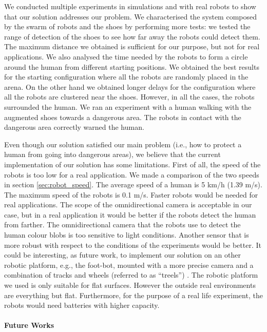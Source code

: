 \documentclass[oneside, a4paper, 12pt]{memoir}
\begin{document}
	We conducted multiple experiments in simulations and with real robots to show that our solution addresses our problem. We characterised the system composed by the swarm of robots and the shoes by performing more tests: we tested the range of detection of the shoes to see how far away the robots could detect them. The maximum distance we obtained is sufficient for our purpose, but not for real applications. We also analysed the time needed by the robots to form a circle around the human from different starting positions. We obtained the best results for the starting configuration where all the robots are randomly placed in the arena. On the other hand we obtained longer delays for the configuration where all the robots are clustered near the shoes. However, in all the cases, the robots surrounded the human. We ran an experiment with a human walking with the augmented shoes towards a dangerous area. The robots in contact with the dangerous area correctly warned the human.
	
	Even though our solution satisfied our main problem (i.e., how to protect a human from going into dangerous areas), we believe that the current implementation of our solution has some limitations. First of all, the speed of the robots is too low for a real application. We made a comparison of the two speeds in section \ref{sec:robot_speed}. The average speed of a human is 5 km/h (1.39 m/s). The maximum speed of the robots is 0.1 m/s. Faster robots would be needed for real applications. The scope of the omnidirectional camera is acceptable in our case, but in a real application it would be better if the robots detect the human from farther. The omnidirectional camera that the robots use to detect the human colour blobs is too sensitive to light conditions. Another sensor that is more robust with respect to the conditions of the experiments would be better. It could be interesting, as future work, to implement our solution on an other robotic platform, e.g., the foot-bot, mounted with a more precise camera and a combination of tracks and wheels (referred to as \enquote{treels}) \citep{dorigo2013swarmanoid}. The robotic platform we used is only suitable for flat surfaces. However the outside real environments are everything but flat. Furthermore, for the purpose of a real life experiment, the robots would need batteries with higher capacity.
	
	\paragraph{Future Works}

		
\end{document}
